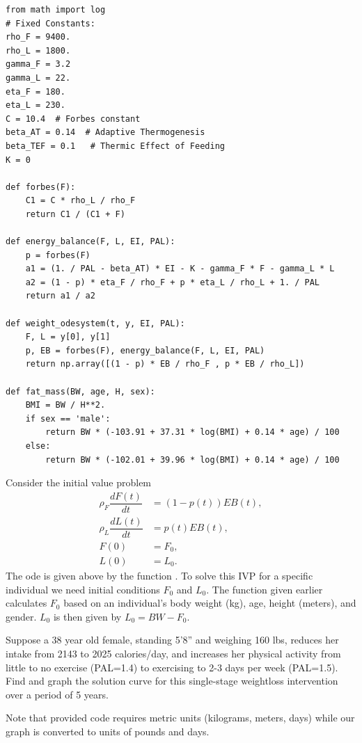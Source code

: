 \begin{lstlisting}
from math import log
# Fixed Constants:
rho_F = 9400.
rho_L = 1800.
gamma_F = 3.2
gamma_L = 22.
eta_F = 180.
eta_L = 230.
C = 10.4  # Forbes constant
beta_AT = 0.14  # Adaptive Thermogenesis
beta_TEF = 0.1   # Thermic Effect of Feeding
K = 0

def forbes(F):
    C1 = C * rho_L / rho_F
    return C1 / (C1 + F)

def energy_balance(F, L, EI, PAL):
    p = forbes(F)
    a1 = (1. / PAL - beta_AT) * EI - K - gamma_F * F - gamma_L * L
    a2 = (1 - p) * eta_F / rho_F + p * eta_L / rho_L + 1. / PAL
    return a1 / a2

def weight_odesystem(t, y, EI, PAL):
    F, L = y[0], y[1]
    p, EB = forbes(F), energy_balance(F, L, EI, PAL)
    return np.array([(1 - p) * EB / rho_F , p * EB / rho_L])

def fat_mass(BW, age, H, sex):
    BMI = BW / H**2.
    if sex == 'male':
        return BW * (-103.91 + 37.31 * log(BMI) + 0.14 * age) / 100
    else:
        return BW * (-102.01 + 39.96 * log(BMI) + 0.14 * age) / 100

\end{lstlisting}

\begin{problem}
Consider the initial value problem
\begin{subequations}
\label{eqn:weight_prob1}
\begin{align*}
\rho_F \dfrac{dF(t)}{dt} &= (1-p(t)) EB(t),\\
\rho_L \dfrac{dL(t)}{dt} &= p(t) EB(t),\\
F(0) &= F_0, \\
L(0) &= L_0.
\end{align*}
\end{subequations}
The ode is given above by the function .
To solve this IVP for a specific individual we need initial conditions $F_0$ and $L_0.$
The function  given earlier calculates $F_0$ based on an individual's body weight (kg), age, height (meters), and gender.
$L_0$ is then given by $L_0 = BW - F_0$.

Suppose a 38 year old female, standing 5'8'' and weighing 160 lbs, reduces her intake from 2143 to 2025 calories/day, and increases her physical activity from little to no exercise (PAL=1.4) to exercising to 2-3 days per week (PAL=1.5).
Find and graph the solution curve for this single-stage weightloss intervention over a period of 5 years.

Note that provided code requires metric units (kilograms, meters, days) while our graph is converted to units of pounds and days.
\end{problem}

